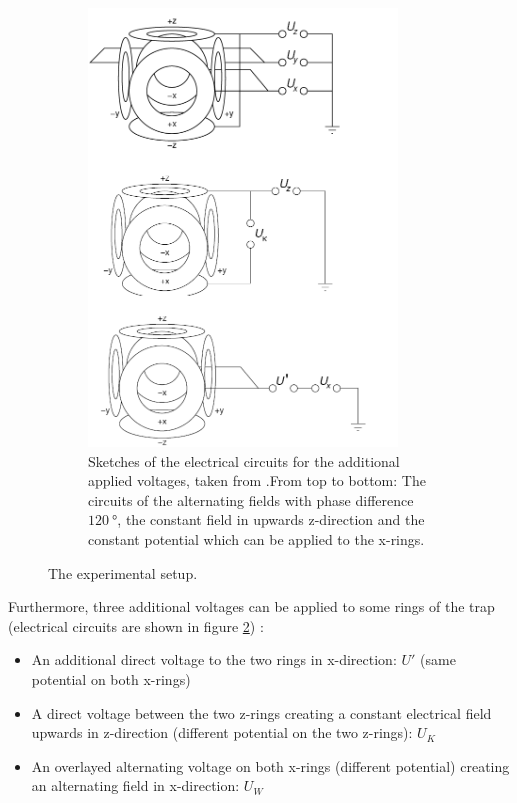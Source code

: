\documentclass[
	paper=A4,
	parskip=full,
	chapterprefix=true,
	11pt,
	headings=normal,
	bibliography=totoc,
	listof=totoc,
	titlepage=on,
]{scrreprt}
\begin{document}
\begin{figure}
\begin{subfigure}[t]{0.4\textwidth}
		\includegraphics[width=0.9\textwidth]{Circuits}
		\caption{Sketches of the electrical circuits for the additional applied voltages, taken from \cite{Lab_manual}.From top to bottom: The circuits of the alternating fields with phase difference $\SI{120}{\degree}$, the constant field in upwards z-direction and the constant potential which can be applied to the x-rings.}
		\label{fig:circuits}
	\end{subfigure}
\caption{The experimental setup.}
\end{figure}

Furthermore, three additional voltages can be applied to some rings of the trap (electrical circuits are shown in figure \ref{fig:circuits}) : 
\begin{itemize}
	\item An additional direct voltage to the two rings in x-direction: $U'$ (same potential on both x-rings)
	\item A direct voltage between the two z-rings creating a constant electrical field upwards in z-direction (different potential on the two z-rings): $U_K$
	\item An overlayed alternating voltage on both x-rings (different potential) creating an alternating field in x-direction: $U_W$
\end{itemize}
\end{document}
